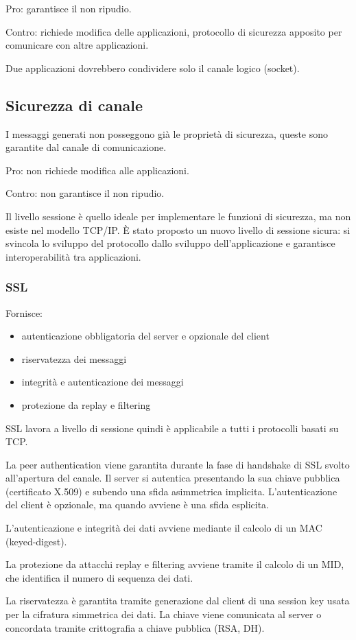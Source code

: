 \documentclass[11pt]{article}
\begin{document}
Pro: garantisce il non ripudio.

Contro: richiede modifica delle applicazioni, protocollo di sicurezza apposito per comunicare con altre applicazioni.

Due applicazioni dovrebbero condividere solo il canale logico (socket).
\subsection{Sicurezza di canale}
I messaggi generati non posseggono già le proprietà di sicurezza, queste sono garantite dal canale di comunicazione. 

Pro: non richiede modifica alle applicazioni.

Contro: non garantisce il non ripudio. 

Il livello sessione è quello ideale per implementare le funzioni di sicurezza, ma non esiste nel modello TCP/IP. È stato 
proposto un nuovo livello di sessione sicura: si svincola lo sviluppo del protocollo dallo sviluppo dell'applicazione e 
garantisce interoperabilità tra applicazioni.
\subsubsection{SSL}
Fornisce:
\begin{itemize}
    \item autenticazione obbligatoria del server e opzionale del client 
    \item riservatezza dei messaggi
    \item integrità e autenticazione dei messaggi 
    \item protezione da replay e filtering 
\end{itemize}
SSL lavora a livello di sessione quindi è applicabile a tutti i protocolli basati su TCP.

La peer authentication viene garantita durante la fase di handshake di SSL svolto all'apertura del canale. Il server si 
autentica presentando la sua chiave pubblica (certificato X.509) e subendo una sfida asimmetrica implicita. L'autenticazione 
del client è opzionale, ma quando avviene è una sfida esplicita.

L'autenticazione e integrità dei dati avviene mediante il calcolo di un MAC (keyed-digest).

La protezione da attacchi replay e filtering avviene tramite il calcolo di un MID, che identifica il numero di sequenza 
dei dati.

La riservatezza è garantita tramite generazione dal client di una session key usata per la cifratura simmetrica dei dati.
La chiave viene comunicata al server o concordata tramite crittografia a chiave pubblica (RSA, DH).
\end{document}
